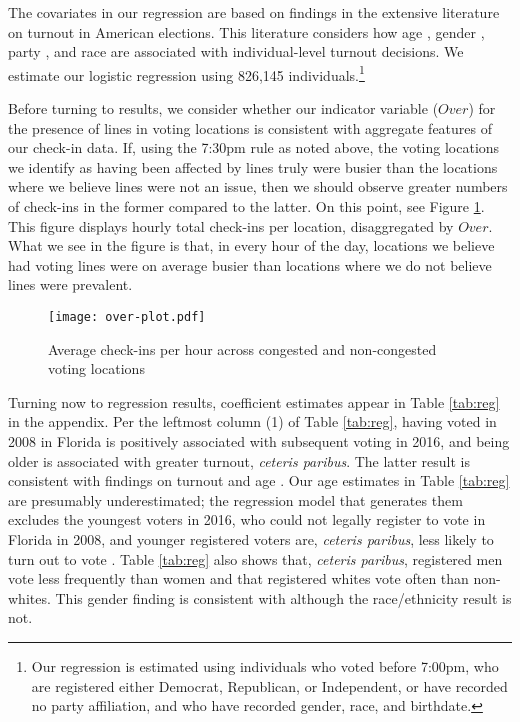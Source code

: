 \documentclass[12pt,titlepage]{article}
\begin{document}
The covariates in our regression are based on findings in the
extensive literature on turnout in American elections. This literature
considers how age \citep{strateetal:age,hightonwolfinger:lifecycle},
gender \citep{schlozman:genderdifferentvoice}, party
\citep{martinezgill:partisanturnout,grofmanetal:turnout}, and race
\citep{verbaetal:raceparticipation,fraga:raceturnout} are associated
with individual-level turnout decisions. We estimate our logistic
regression using 826,145 individuals.\footnote{Our regression is
  estimated using individuals who voted before 7:00pm, who are
  registered either Democrat, Republican, or Independent, or have
  recorded no party affiliation, and who have recorded gender, race,
  and birthdate.}

Before turning to results, we consider whether our indicator variable
($Over$) for the presence of lines in voting locations is consistent
with aggregate features of our check-in data. If, using the 7:30pm
rule as noted above, the voting locations we identify as having been
affected by lines truly were busier than the locations where we
believe lines were not an issue, then we should observe greater
numbers of check-ins in the former compared to the latter. On this
point, see Figure \ref{fig:overplot}. This figure displays hourly total check-ins
per location, disaggregated by $Over$. What we see in the figure is
that, in every hour of the day, locations we believe had voting lines
were on average busier than locations where we do not believe lines were
prevalent.%

\begin{figure}[!ht]
  \caption{Average check-ins per hour across congested and non-congested
    voting locations}
  \label{fig:overplot}
  \centering
    \centering\texttt{[image: over-plot.pdf]}
\end{figure}

Turning now to regression results, coefficient estimates appear in
Table \ref{tab:reg} in the appendix. Per the leftmost column (1) of
Table \ref{tab:reg}, having voted in 2008 in Florida is positively
associated with subsequent voting in 2016, and being older is
associated with greater turnout, \emph{ceteris paribus}. The latter
result is consistent with findings on turnout and age
\citep{costaetal:walkingthewalk}. Our age estimates in Table
\ref{tab:reg} are presumably underestimated; the regression model that
generates them excludes the youngest voters in 2016, who could not
legally register to vote in Florida in 2008, and younger registered
voters are, \emph{ceteris paribus}, less likely to turn out to vote
\citep{shinosmith:registrationtiming}. Table \ref{tab:reg} also shows
that, \emph{ceteris paribus}, registered men vote less frequently than
women and that registered whites vote often than non-whites. This
gender finding is consistent with \citet{leighleynagler:whovotesnow}
although the race/ethnicity result is not.
\end{document}

